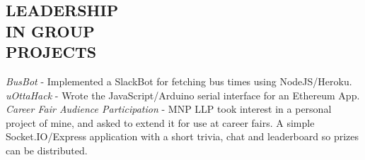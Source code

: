\documentclass[margin]{res}
\begin{document}
\begin{resume}
\section{LEADERSHIP \\ IN GROUP \\ PROJECTS}
{\sl BusBot} - Implemented a SlackBot for fetching bus times using NodeJS/Heroku.\\
{\sl uOttaHack} - Wrote the JavaScript/Arduino serial interface for an Ethereum App.\\
{\sl Career Fair Audience Participation} - MNP LLP took interest in a personal project of mine, and asked to extend it for use at career fairs. A simple Socket.IO/Express application with a short trivia, chat and leaderboard so prizes can be distributed.\\

\end{resume}
\end{document}
